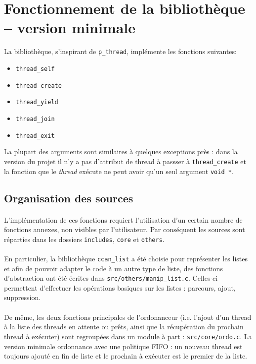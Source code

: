 \section{Fonctionnement de la bibliothèque -- version minimale}

 La bibliothèque, s'inspirant de \texttt{p\_thread}, implémente les
fonctions suivantes:
\begin{itemize}
  \item \texttt{thread\_self}
  \item \texttt{thread\_create}
  \item \texttt{thread\_yield}
  \item \texttt{thread\_join}
  \item \texttt{thread\_exit}
\end{itemize}
La plupart des arguments sont similaires à quelques exceptions près : dans la version du projet il n'y a pas d'attribut de thread à passser à \texttt{thread\_create} et la fonction que le \emph{thread} exécute ne peut avoir qu'un seul argument \texttt{void *}.

\subsection{Organisation des sources}

\paragraph{} 
L'implémentation de ces fonctions requiert l'utilisation d'un certain nombre de fonctions annexes, non visibles par l'utilisateur. Par conséquent les sources sont réparties dans les dossiers \texttt{includes}, \texttt{core} et \texttt{others}.

\paragraph{}
En particulier, la bibliothèque \texttt{ccan\_list} a été choisie pour
représenter les listes et afin de pouvoir adapter le code à un
autre type de liste, des fonctions d'abstraction ont été écrites dans
\texttt{src/others/manip\_list.c}. Celles-ci permettent d'effectuer
les opérations basiques sur les listes : parcours, ajout,
suppression. 

\paragraph{}
De même, les deux fonctions principales de l'ordonanceur 
(i.e. l'ajout d'un thread à la liste des threads
en attente ou prêts, ainsi que la récupération du prochain thread à
exécuter) sont regroupées dans un module à part :
\texttt{src/core/ordo.c}. La version minimale ordonnance avec une politique FIFO : 
un nouveau thread est toujours ajouté en fin de liste et le prochain à exécuter est le premier de la liste.

